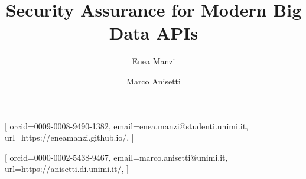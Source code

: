 \documentclass[
]{ceurart}
\begin{document}



\title{Security Assurance for Modern Big Data APIs}


\author[1]{Enea Manzi}[%
  orcid=0009-0008-9490-1382,
  email=enea.manzi@studenti.unimi.it,
  url=https://eneamanzi.github.io/,
]
\cormark[1]

\author[1]{Marco Anisetti}[%
  orcid=0000-0002-5438-9467,
  email=marco.anisetti@unimi.it,
  url=https://anisetti.di.unimi.it/,
]
\end{document}
